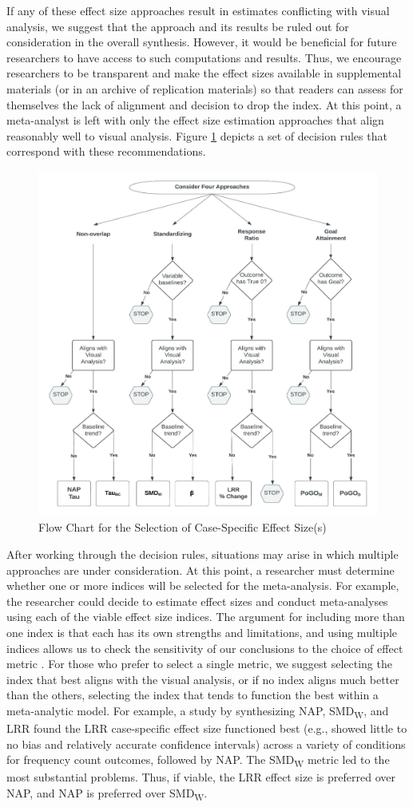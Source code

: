 \documentclass[
]{book}
\begin{document}
If any of these effect size approaches result in estimates conflicting with visual analysis, we suggest that the approach and its results be ruled out for consideration in the overall synthesis. However, it would be beneficial for future researchers to have access to such computations and results. Thus, we encourage researchers to be transparent and make the effect sizes available in supplemental materials (or in an archive of replication materials) so that readers can assess for themselves the lack of alignment and decision to drop the index. At this point, a meta-analyst is left with only the effect size estimation approaches that align reasonably well to visual analysis. Figure \ref{fig:CaseSpecificES-flowchart} depicts a set of decision rules that correspond with these recommendations.

\begin{figure}
\includegraphics[width=0.6\linewidth]{images/flowchart_CaseSpecificES} \caption{Flow Chart for the Selection of Case-Specific Effect Size(s)}\label{fig:CaseSpecificES-flowchart}
\end{figure}

After working through the decision rules, situations may arise in which multiple approaches are under consideration. At this point, a researcher must determine whether one or more indices will be selected for the meta-analysis. For example, the researcher could decide to estimate effect sizes and conduct meta-analyses using each of the viable effect size indices. The argument for including more than one index is that each has its own strengths and limitations, and using multiple indices allows us to check the sensitivity of our conclusions to the choice of effect metric \citep{Kratochwill2010single}. For those who prefer to select a single metric, we suggest selecting the index that best aligns with the visual analysis, or if no index aligns much better than the others, selecting the index that tends to function the best within a meta-analytic model. For example, a study by \citet{Chen_Pustejovsky_2022} synthesizing NAP, SMD\textsubscript{W}, and LRR found the LRR case-specific effect size functioned best (e.g., showed little to no bias and relatively accurate confidence intervals) across a variety of conditions for frequency count outcomes, followed by NAP. The SMD\textsubscript{W} metric led to the most substantial problems. Thus, if viable, the LRR effect size is preferred over NAP, and NAP is preferred over SMD\textsubscript{W}.
\end{document}
